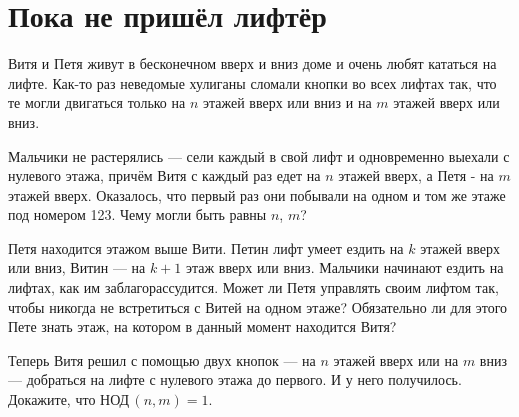 \section{Пока не пришёл лифтёр}

\noindent Витя и Петя живут в бесконечном вверх и вниз доме и очень любят кататься на лифте. Как-то раз неведомые хулиганы сломали кнопки во всех лифтах так, что те могли двигаться только на $n$ этажей вверх или вниз и на $m$ этажей вверх или вниз. 
\begin{itemize}

\itA Мальчики не растерялись — сели каждый в свой лифт и одновременно выехали с нулевого этажа, причём Витя с каждый раз едет на $n$ этажей вверх, а Петя - на $m$ этажей вверх. Оказалось, что первый раз они побывали на одном и том же этаже под номером 123. Чему могли быть равны $n$, $m$?

\itB Петя находится этажом выше Вити. Петин лифт умеет ездить на $k$ этажей вверх или вниз, Витин — на $k+1$ этаж вверх или вниз. Мальчики начинают ездить на лифтах, как им заблагорассудится. Может ли Петя управлять своим лифтом так, чтобы никогда не встретиться с Витей на одном этаже? Обязательно ли для этого Пете знать этаж, на котором в данный момент находится Витя?

\itC Теперь Витя решил с помощью двух кнопок — на $n$ этажей вверх или на $m$ вниз — добраться на лифте с нулевого этажа до первого. И у него получилось. Докажите, что НОД\,$(n,m)=1$.
\end{itemize}